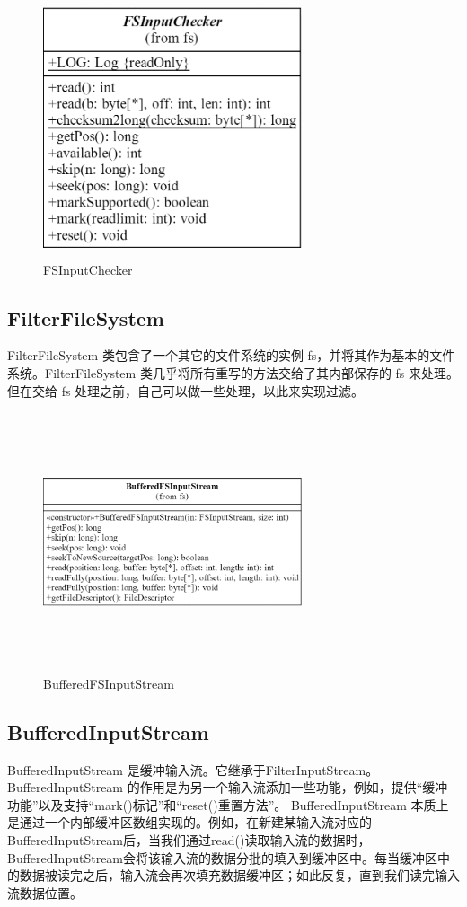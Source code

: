 	\begin{figure}
		\centering
		\includegraphics[width=3in,height=3in]{UML/inputstream/FSInputChecker.png}
		\caption{FSInputChecker}
		\label{fig:graph7}
	\end{figure}
	\subsection{FilterFileSystem} 
	FilterFileSystem 类包含了一个其它的文件系统的实例 fs，并将其作为基本的文件系统。FilterFileSystem 类几乎将所有重写的方法交给了其内部保存的 fs 来处理。但在交给 fs 处理之前，自己可以做一些处理，以此来实现过滤。
	\begin{figure}
		\centering
		\includegraphics[width=3in,height=3in]{UML/inputstream/BufferedFSInputStream.png}
		\caption{BufferedFSInputStream}
		\label{fig:graph8}
	\end{figure}
	
	\subsection{BufferedInputStream} 
	BufferedInputStream 是缓冲输入流。它继承于FilterInputStream。
	BufferedInputStream 的作用是为另一个输入流添加一些功能，例如，提供“缓冲功能”以及支持“mark()标记”和“reset()重置方法”。
	BufferedInputStream 本质上是通过一个内部缓冲区数组实现的。例如，在新建某输入流对应的BufferedInputStream后，当我们通过read()读取输入流的数据时，BufferedInputStream会将该输入流的数据分批的填入到缓冲区中。每当缓冲区中的数据被读完之后，输入流会再次填充数据缓冲区；如此反复，直到我们读完输入流数据位置。
	
	\endinput